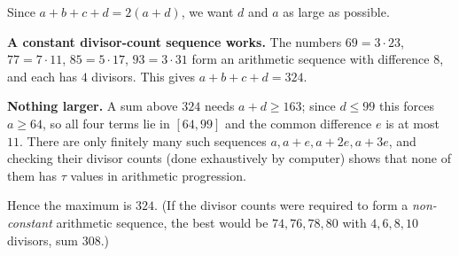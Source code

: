Since $a+b+c+d=2(a+d)$, we want $d$ and $a$ as large as possible.

\textbf{A constant divisor-count sequence works.} The numbers $69=3\cdot23$, $77=7\cdot11$, $85=5\cdot17$, $93=3\cdot31$ form an arithmetic sequence with difference $8$, and each has $4$ divisors. This gives $a+b+c+d=324$.

\textbf{Nothing larger.} A sum above $324$ needs $a+d\ge163$; since $d\le99$ this forces $a\ge64$, so all four terms lie in $[64,99]$ and the common difference $e$ is at most $11$. There are only finitely many such sequences $a,a+e,a+2e,a+3e$, and checking their divisor counts (done exhaustively by computer) shows that none of them has $\tau$ values in arithmetic progression.

Hence the maximum is $\boxed{324}$. (If the divisor counts were required to form a \emph{non-constant} arithmetic sequence, the best would be $74,76,78,80$ with $4,6,8,10$ divisors, sum $308$.)

